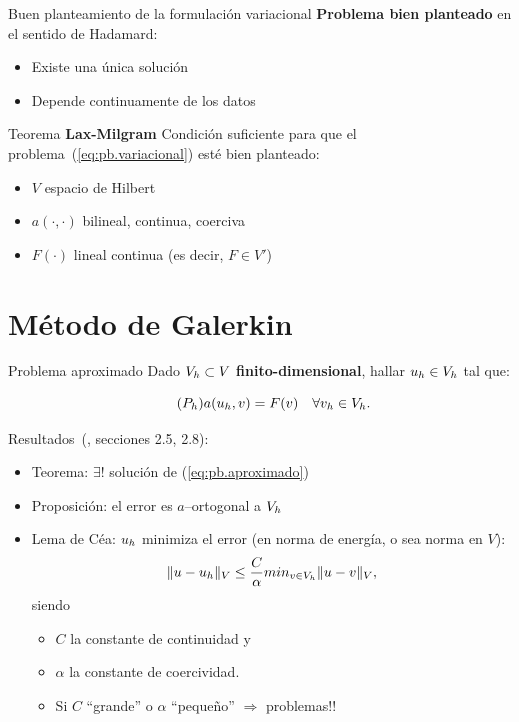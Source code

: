\documentclass[10pt,leqno]{beamer}
\begin{document}
\begin{frame}{Buen planteamiento de la formulación variacional}
  \textbf{Problema bien planteado} en el sentido de Hadamard:
  \begin{itemize}
  \item Existe una única solución
  \item Depende continuamente de los datos
  \end{itemize}

  \begin{block}{Teorema \textbf{Lax-Milgram}}
    Condición suficiente para que el
    problema~(\ref{eq:pb.variacional}) esté bien planteado:
    \begin{itemize}
    \item $V$ espacio de Hilbert
    \item $a(\cdot,\cdot)$ bilineal, continua, coerciva
    \item $F(\cdot)$ lineal continua (es decir, $F\in V'$)
    \end{itemize}
  \end{block}
\end{frame}

\section{Método de Galerkin}
\label{sec:buen-plant-de-1}

\begin{frame}{Problema aproximado}
  Dado $\Vh\subset V$ \textbf{finito-dimensional}, hallar $\uh\in\Vh$ tal que:
  \begin{block}{}
    \vspace{-2.5ex}
    \begin{equation}
      \label{eq:pb.aproximado}
      \tag{$P_h$}
      a(\uh,v)= F(v) \quad \forall \vh \in \Vh.
    \end{equation}
  \end{block}
  Resultados~(\cite{Brenner-Scott:08}, secciones 2.5, 2.8):
  \begin{itemize}
  \item Teorema: $\exists!$ solución de (\ref{eq:pb.aproximado})
  \item Proposición: el error es $a$--ortogonal a $\Vh$
  \item Lema de Céa: $\uh$ minimiza el error (en norma de energía, o
    sea norma en $V$):
    $$\norm[V]{u-\uh} \le \frac{C}{\alpha} min_{v\in\Vh}\norm[V]{u-v},$$
    siendo
    \begin{itemize}
    \item $C$ la constante de continuidad y
    \item $\alpha$ la constante de coercividad.
    \item Si $C$ ``grande'' o $\alpha$ ``pequeño'' $\Rightarrow$ problemas!!
    \end{itemize}
  \end{itemize}
\end{frame}
\end{document}
